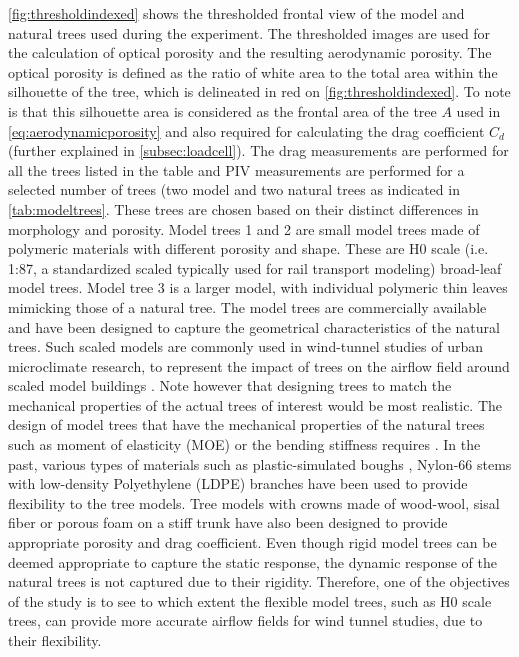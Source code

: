 \cref{fig:thresholdindexed} shows the thresholded frontal view of the model and natural trees used during the experiment. The thresholded images are used for the calculation of optical porosity and the resulting aerodynamic porosity. The optical porosity is defined as the ratio of white area to the total area within the silhouette of the tree, which is delineated in red on \cref{fig:thresholdindexed}. To note is that this silhouette area is considered as the frontal area of the tree $A$ used in \cref{eq:aerodynamicporosity} and also required for calculating the drag coefficient $C_d$ (further explained in \cref{subsec:loadcell}). The drag measurements are performed for all the trees listed in the table and PIV measurements are performed for a selected number of trees (two model and two natural trees as indicated in \cref{tab:modeltrees}. These trees are chosen based on their distinct differences in morphology and porosity. Model trees 1 and 2 are small model trees made of polymeric materials with different porosity and shape. These are H$0$ scale (i.e. 1:87, a standardized scaled typically used for rail transport modeling) broad-leaf model trees. Model tree 3 is a larger model, with individual polymeric thin leaves mimicking those of a natural tree. The model trees are commercially available and have been designed to capture the geometrical characteristics of the natural trees. Such scaled models are commonly used in wind-tunnel studies of urban microclimate research, to represent the impact of trees on the airflow field around scaled model buildings \citep{Gromke2018a,Gromke2008,Gromke2007,Guan2003,R.N.Meroney1968}. Note however that designing trees to match the mechanical properties of the actual trees of interest would be most realistic. The design of model trees that have the mechanical properties of the natural trees such as moment of elasticity (MOE) or the bending stiffness requires . In the past, various types of materials such as plastic-simulated boughs \citep{R.N.Meroney1968}, Nylon-66 stems with low-density Polyethylene (LDPE) branches \citep{Stacey1994} have been used to provide flexibility to the tree models. Tree models with crowns made of wood-wool, sisal fiber or porous foam on a stiff trunk \citep{Gromke2008a} have also been designed to provide appropriate porosity and drag coefficient. Even though rigid model trees can be deemed appropriate to capture the static response, the dynamic response of the natural trees is not captured due to their rigidity. Therefore, one of the objectives of the study is to see to which extent the flexible model trees, such as H$0$ scale trees, can provide more accurate airflow fields for wind tunnel studies, due to their flexibility. 


